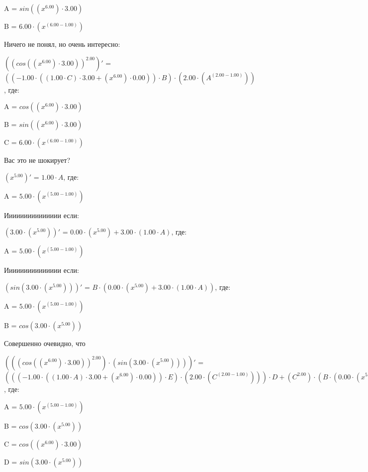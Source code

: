 \documentclass{article}
\begin{document}
\bigskip\qquad A = $sin(({x}^{6.00}) \cdot 3.00)$

\qquad B = $6.00 \cdot ({x}^{(6.00 - 1.00)})$



\bigskip Ничего не понял, но очень интересно:

$({(cos(({x}^{6.00}) \cdot 3.00))}^{2.00})'$ = $((-1.00 \cdot ((1.00 \cdot C) \cdot 3.00 + ({x}^{6.00}) \cdot 0.00)) \cdot B) \cdot (2.00 \cdot ({A}^{(2.00 - 1.00)}))$, где:

\bigskip\qquad A = $cos(({x}^{6.00}) \cdot 3.00)$

\qquad B = $sin(({x}^{6.00}) \cdot 3.00)$

\qquad C = $6.00 \cdot ({x}^{(6.00 - 1.00)})$



\bigskip Вас это не шокирует?

$({x}^{5.00})'$ = $1.00 \cdot A$, где:

\bigskip\qquad A = $5.00 \cdot ({x}^{(5.00 - 1.00)})$



\bigskip Иииииииииииииии если:

$(3.00 \cdot ({x}^{5.00}))'$ = $0.00 \cdot ({x}^{5.00}) + 3.00 \cdot (1.00 \cdot A)$, где:

\bigskip\qquad A = $5.00 \cdot ({x}^{(5.00 - 1.00)})$



\bigskip Иииииииииииииии если:

$(sin(3.00 \cdot ({x}^{5.00})))'$ = $B \cdot (0.00 \cdot ({x}^{5.00}) + 3.00 \cdot (1.00 \cdot A))$, где:

\bigskip\qquad A = $5.00 \cdot ({x}^{(5.00 - 1.00)})$

\qquad B = $cos(3.00 \cdot ({x}^{5.00}))$



\bigskip Совершенно очевидно, что

$(({(cos(({x}^{6.00}) \cdot 3.00))}^{2.00}) \cdot (sin(3.00 \cdot ({x}^{5.00}))))'$ = $(((-1.00 \cdot ((1.00 \cdot A) \cdot 3.00 + ({x}^{6.00}) \cdot 0.00)) \cdot E) \cdot (2.00 \cdot ({C}^{(2.00 - 1.00)}))) \cdot D + ({C}^{2.00}) \cdot (B \cdot (0.00 \cdot ({x}^{5.00}) + 3.00 \cdot (1.00 \cdot A)))$, где:

\bigskip\qquad A = $5.00 \cdot ({x}^{(5.00 - 1.00)})$

\qquad B = $cos(3.00 \cdot ({x}^{5.00}))$

\qquad C = $cos(({x}^{6.00}) \cdot 3.00)$

\qquad D = $sin(3.00 \cdot ({x}^{5.00}))$
\end{document}

